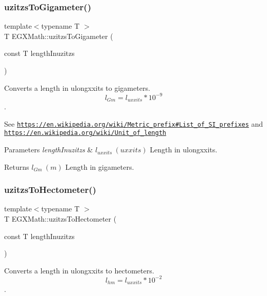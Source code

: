 \subsubsection{\texorpdfstring{uzitzs\+To\+Gigameter()}{uzitzsToGigameter()}}
{\footnotesize\ttfamily template$<$typename T $>$ \\
T E\+G\+X\+Math\+::uzitzs\+To\+Gigameter (\begin{DoxyParamCaption}\item[{const T}]{length\+Inuzitzs }\end{DoxyParamCaption})}



Converts a length in ulongxxits to gigameters. \[ l_{Gm}=l_{uxxits} * 10^{-9} \]. 

See \href{https://en.wikipedia.org/wiki/Metric_prefix#List_of_SI_prefixes}{\tt https\+://en.\+wikipedia.\+org/wiki/\+Metric\+\_\+prefix\#\+List\+\_\+of\+\_\+\+S\+I\+\_\+prefixes} and \href{https://en.wikipedia.org/wiki/Unit_of_length}{\tt https\+://en.\+wikipedia.\+org/wiki/\+Unit\+\_\+of\+\_\+length} 
\begin{DoxyParams}{Parameters}
{\em length\+Inuzitzs} & $ l_{uxxits}\ (uxxits)$ Length in ulongxxits. \\
\hline
\end{DoxyParams}
\begin{DoxyReturn}{Returns}
$ l_{Gm}\ (m)$ Length in gigameters. 
\end{DoxyReturn}
\mbox{\label{group___e_g_x_math-_conversions-_length_conversions-_non-_s_i-uzitzs-_s_i_gabc1973b8ea47e021bd981f94ac1f254d}} 
\subsubsection{\texorpdfstring{uzitzs\+To\+Hectometer()}{uzitzsToHectometer()}}
{\footnotesize\ttfamily template$<$typename T $>$ \\
T E\+G\+X\+Math\+::uzitzs\+To\+Hectometer (\begin{DoxyParamCaption}\item[{const T}]{length\+Inuzitzs }\end{DoxyParamCaption})}



Converts a length in ulongxxits to hectometers. \[ l_{hm}=l_{uxxits} * 10^{-2} \]. 

